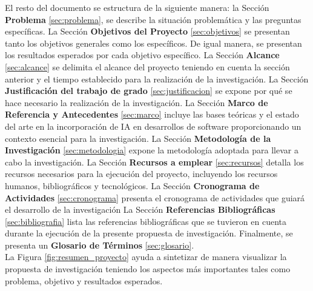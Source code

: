 
El resto del documento se estructura de la siguiente manera: la Sección \textbf{Problema} \ref{sec:problema}, se describe la situación problemática y las preguntas específicas. La Sección \textbf{Objetivos del Proyecto} \ref{sec:objetivos} se presentan tanto los objetivos generales como los específicos. De igual manera, se presentan los resultados esperados por cada objetivo específico. La Sección \textbf{Alcance} \ref{sec:alcance} se delimita el alcance del proyecto teniendo en cuenta la sección anterior y el tiempo establecido para la realización de la investigación. La Sección \textbf{Justificación del trabajo de grado} \ref{sec:justificacion} se expone por qué se hace necesario la realización de la investigación. La Sección \textbf{Marco de Referencia y Antecedentes} \ref{sec:marco} incluye las bases teóricas y el estado del arte en la incorporación de IA en desarrollos de software proporcionando un contexto esencial para la investigación. La Sección \textbf{Metodología de la Investigación} \ref{sec:metodologia} expone la metodología adoptada para llevar a cabo la investigación. La Sección \textbf{Recursos a emplear} \ref{sec:recursos} detalla los recursos necesarios para la ejecución del proyecto, incluyendo los recursos humanos, bibliográficos y tecnológicos. La Sección \textbf{Cronograma de Actividades} \ref{sec:cronograma} presenta el cronograma de actividades que guiará el desarrollo de la investigación La Sección \textbf{Referencias Bibliográficas} \ref{sec:bibliografia} lista las referencias bibliográficas que se tuvieron en cuenta durante la ejecución de la presente propuesta de investigación. Finalmente, se presenta un \textbf{Glosario de Términos} \ref{sec:glosario}.\\

La Figura \ref{fig:resumen_proyecto} ayuda a sintetizar de manera visualizar la propuesta de investigación teniendo los aspectos más importantes tales como problema, objetivo y resultados esperados.



